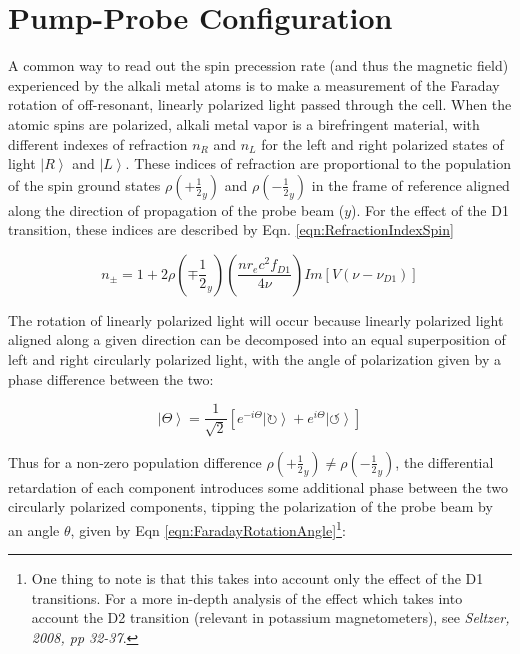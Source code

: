 \documentclass[PaulGanssle-Thesis.tex]{subfiles}
\begin{document}
\section{Pump-Probe Configuration}
\label{mag.design.pump-probe}
A common way to read out the spin precession rate (and thus the magnetic field) experienced by the alkali metal atoms is to make a measurement of the Faraday rotation of off-resonant, linearly polarized light passed through the cell. When the atomic spins are polarized, alkali metal vapor is a birefringent material, with different indexes of refraction $n_{R}$ and $n_{L}$ for the left and right polarized states of light $\left|R\right\rangle$ and $\left|L\right\rangle$. These indices of refraction are proportional to the population of the spin ground states $\rho\left(+\frac{1}{2}_{y}\right)$ and $\rho(-\frac{1}{2}_{y})$ in the frame of reference aligned along the direction of propagation of the probe beam ($y$). For the effect of the D1 transition, these indices are described by Eqn. \ref{eqn:RefractionIndexSpin}\cite{Seltzer2008}

\begin{equation}
\label{eqn:RefractionIndexSpin}
n_{\pm} = 1 + 2\rho\left(\mp\frac{1}{2}_{y}\right)\left(\frac{nr_{e}c^2f_{D1}}{4\nu}\right)Im\left[V(\nu - \nu_{D1})\right]
\end{equation}

The rotation of linearly polarized light will occur because linearly polarized light aligned along a given direction can be decomposed into an equal superposition of left and right circularly polarized light, with the angle of polarization given by a phase difference between the two:

\begin{equation}
\label{eqn:LinearCircularBasisTransform}
\left|\Theta\right\rangle = \frac{1}{\sqrt{2}}\left[e^{-i\Theta}\left|\circlearrowright\right\rangle + e^{i\Theta}\left|\circlearrowleft\right\rangle\right]
\end{equation}

Thus for a non-zero population difference $\rho\left(+\frac{1}{2}_{y}\right) \neq \rho\left(-\frac{1}{2}_{y}\right)$, the differential retardation of each component introduces some additional phase between the two circularly polarized components, tipping the polarization of the probe beam by an angle $\theta$, given by Eqn \ref{eqn:FaradayRotationAngle}\footnote{One thing to note is that this takes into account only the effect of the D1 transitions. For a more in-depth analysis of the effect which takes into account the D2 transition (relevant in potassium magnetometers), see \textit{Seltzer, 2008, pp 32-37}\cite{Seltzer2008}.}:
\end{document}
